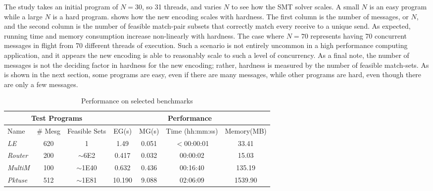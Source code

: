 The study takes an initial program of $N = 30$, so 31 threads, and varies $N$ to see how the SMT solver scales. A small $N$ is an easy program while a large $N$ is a hard program.  shows how the new encoding scales with hardness. The first column is the number of messages, or $N$, and the second column is the number of feasible match-pair subsets that correctly match every receive to a unique send. As expected, running time and memory consumption increase non-linearly with hardness. The case where $N=70$ represents having 70 concurrent messages in flight from 70 different threads of execution. Such a scenario is not entirely uncommon in a high performance computing application, and it appears the new encoding is able to reasonably scale to such a level of concurrency. As a final note, the number of messages is not the deciding factor in hardness for the new encoding; rather, hardness is measured by the number of feasible match-sets. As is shown in the next section, some programs are easy, even if there are many messages, while other programs are hard, even though there are only a few messages.

\begin{table}
\begin{center}
\setlength{\tabcolsep}{2pt}
\scriptsize
\caption{Performance on selected benchmarks \label{table:second}}
\begin{tabular}{|l|c|c|c|c|c|c|}
		\hline
         \multicolumn{3}{|c|}{Test Programs} & \multicolumn{4}{|c|}{Performance} \\ \hline
         Name & \# Mesg & Feasible Sets & EG(s) & MG(s) & Time (hh:mm:ss) & Memory(MB) \\ \hline
         \textit{LE} & 620 & 1 & 1.49 & 0.051 & $<$00:00:01 & 33.41  \\ %
         \textit{Router} & 200 & $\sim$6E2 & 0.417 & 0.032 & 00:00:02 & 15.03  \\ %
         \textit{MultiM} & 100 & $\sim$1E40 & 0.632 & 0.436 &  00:16:40 & 135.19  \\ %
         \textit{Pktuse} & 512 & $\sim$1E81 & 10.190 & 9.088 & 02:06:09 & 1539.90 \\ %
         \hline
		\end{tabular}
\end{center}
\end{table}

